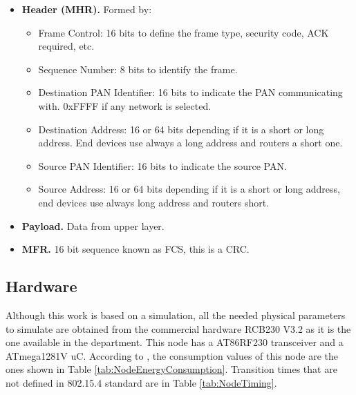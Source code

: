 \begin{itemize}
 \item \textbf{Header (\ac{MHR}).} Formed by:
  \begin{itemize}
   \item Frame Control: 16 bits to define the frame type, security code, \ac{ACK} required, etc.
   \item Sequence Number: 8 bits to identify the frame.
   \item Destination \ac{PAN} Identifier: 16 bits to indicate the \ac{PAN} communicating with. 0xFFFF if any network is selected.
   \item Destination Address: 16 or 64 bits depending if it is a short or long address. End devices use always a long address and routers a short one.
   \item Source PAN Identifier: 16 bits to indicate the source \ac{PAN}.
   \item Source Address: 16 or 64 bits depending if it is a short or long address, end devices use always long address and routers short.
  \end{itemize}
 \item \textbf{Payload.} Data from upper layer.
 \item \textbf{\ac{MFR}.} 16 bit sequence known as \ac{FCS}, this is a \ac{CRC}.
\end{itemize}

\subsection{Hardware}

Although this work is based on a simulation, all the needed physical parameters to simulate are obtained from the commercial hardware 
RCB230 V3.2 as it is the one available in the department. This node has a AT86RF230 transceiver and a ATmega1281V \ac{uC}.
According to \cite{LPLandOLP}, the consumption values of this node are the ones shown in Table \ref{tab:NodeEnergyConsumption}. Transition 
times that are not defined in 802.15.4 standard are in Table \ref{tab:NodeTiming}.

